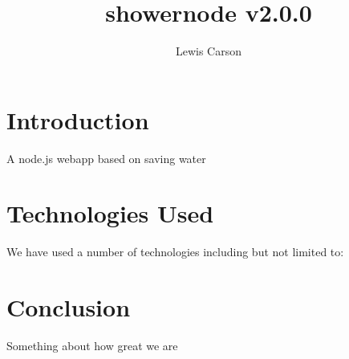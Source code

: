 \documentclass{article}
\begin{document}
\title{showernode v2.0.0}
\author{Lewis Carson}

\maketitle

\section{Introduction}
A node.js webapp based on saving water

\section{Technologies Used}
We have used a number of technologies including but not limited to:

\section{Conclusion}
Something about how great we are
\end{document}
